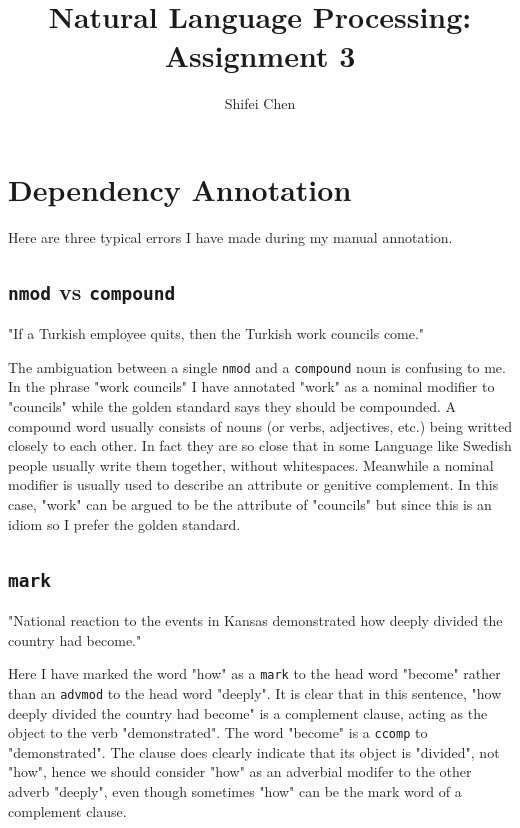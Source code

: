 \documentclass[11pt]{article} %
\title{{\LARGE Natural Language Processing: Assignment 3}\\[1.5mm]} %
\author{Shifei Chen} %
\begin{document}
\maketitle

\section{Dependency Annotation}

Here are three typical errors I have made during my manual annotation.

\subsection{\texttt{nmod} vs \texttt{compound}}

\begin{displayquote}
  "If a Turkish employee quits, then the Turkish work councils come."
\end{displayquote}

The ambiguation between a single \texttt{nmod} and a \texttt{compound} noun is confusing to me. In the phrase "work councils" I have annotated "work" as a nominal modifier to "councils" while the golden standard says they should be compounded. A compound word usually consists of nouns (or verbs, adjectives, etc.) being writted closely to each other. In fact they are so close that in some Language like Swedish people usually write them together, without whitespaces. Meanwhile a nominal modifier is usually used to describe an attribute or genitive complement\cite{NmodUD}. In this case, "work" can be argued to be the attribute of "councils" but since this is an idiom\cite{WorksCouncilWiki} so I prefer the golden standard.

\subsection{\texttt{mark}}

\begin{displayquote}
  "National reaction to the events in Kansas demonstrated how deeply divided the country had become."
\end{displayquote}

Here I have marked the word "how" as a \texttt{mark} to the head word "become" rather than an \texttt{advmod} to the head word "deeply". It is clear that in this sentence, "how deeply divided the country had become" is a complement clause, acting as the object to the verb "demonstrated". The word "become" is a \texttt{ccomp} to "demonstrated"\cite{CcompUD}. The clause does clearly indicate that its object is "divided", not "how", hence we should consider "how" as an adverbial modifer to the other adverb "deeply", even though sometimes "how" can be the mark word of a complement clause\cite{MarkUD}.
\end{document}
